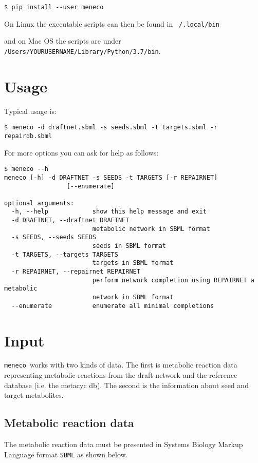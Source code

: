\documentclass{article}
\newcommand\meneco{\texttt{meneco}}
\begin{document}
\begin{Verbatim}[frame=single]
$ pip install --user meneco
\end{Verbatim}

On Linux the executable scripts can then be found in \texttt{~/.local/bin}

and on Mac OS the scripts are under \texttt{/Users/YOURUSERNAME/Library/Python/3.7/bin}.

\section{Usage}

Typical usage is:
\begin{Verbatim}[frame=single]
$ meneco -d draftnet.sbml -s seeds.sbml -t targets.sbml -r repairdb.sbml
\end{Verbatim}
For more options you can ask for help as follows:
\begin{Verbatim}[frame=single]
$ meneco --h
meneco [-h] -d DRAFTNET -s SEEDS -t TARGETS [-r REPAIRNET]
                 [--enumerate]

optional arguments:
  -h, --help            show this help message and exit
  -d DRAFTNET, --draftnet DRAFTNET
                        metabolic network in SBML format
  -s SEEDS, --seeds SEEDS
                        seeds in SBML format
  -t TARGETS, --targets TARGETS
                        targets in SBML format
  -r REPAIRNET, --repairnet REPAIRNET
                        perform network completion using REPAIRNET a metabolic
                        network in SBML format
  --enumerate           enumerate all minimal completions
\end{Verbatim}


\section{Input}

\meneco\ works with two kinds of data.
The first is metabolic reaction data representing metabolic reactions from the draft network and the reference database (i.e. the metacyc db).
The second is the information about seed and target metabolites.


\subsection{Metabolic reaction data}

The metabolic reaction data must be presented in Systems Biology Markup Language format \texttt{SBML} as shown below.
\end{document}
